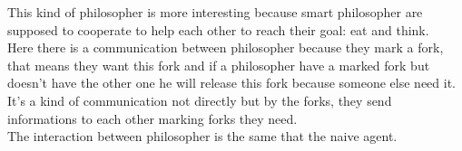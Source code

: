 This kind of philosopher is more interesting because smart philosopher are supposed to cooperate to help each other to reach their goal: eat and think.\\
Here there is a communication between philosopher because they mark a fork, that means they want this fork and if a philosopher have a marked fork but doesn't have the other one he will release this fork because someone else need it.\\
It's a kind of communication not directly but by the forks, they send informations to each other marking forks they need.\\
The interaction  between philosopher is the same that the naive agent.